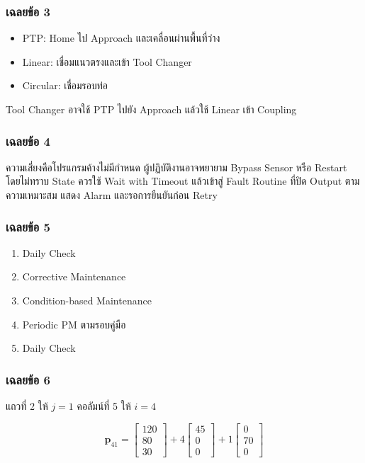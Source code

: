 \subsubsection{เฉลยข้อ 3}

\begin{itemize}
    \item PTP: Home ไป Approach และเคลื่อนผ่านพื้นที่ว่าง
    \item Linear: เชื่อมแนวตรงและเข้า Tool Changer
    \item Circular: เชื่อมรอบท่อ
\end{itemize}

Tool Changer อาจใช้ PTP ไปยัง Approach แล้วใช้ Linear เข้า Coupling

\subsubsection{เฉลยข้อ 4}

ความเสี่ยงคือโปรแกรมค้างไม่มีกำหนด ผู้ปฏิบัติงานอาจพยายาม Bypass Sensor หรือ Restart โดยไม่ทราบ State ควรใช้ Wait with Timeout แล้วเข้าสู่ Fault Routine ที่ปิด Output ตามความเหมาะสม แสดง Alarm และรอการยืนยันก่อน Retry

\subsubsection{เฉลยข้อ 5}

\begin{enumerate}
    \item Daily Check
    \item Corrective Maintenance
    \item Condition-based Maintenance
    \item Periodic PM ตามรอบคู่มือ
    \item Daily Check
\end{enumerate}

\subsubsection{เฉลยข้อ 6}

แถวที่ 2 ให้ $j=1$ คอลัมน์ที่ 5 ให้ $i=4$

\[
\mathbf{p}_{41}=
\begin{bmatrix}120\\80\\30\end{bmatrix}
+4\begin{bmatrix}45\\0\\0\end{bmatrix}
+1\begin{bmatrix}0\\70\\0\end{bmatrix}
\]

